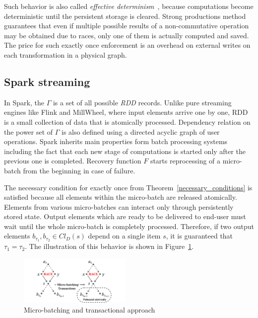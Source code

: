 Such behavior is also called {\em effective determinism}~\cite{akidau2018streaming}, because computations become deterministic until the persistent storage is cleared. Strong productions method guarantees that even if multiple possible results of a non-commutative operation may be obtained due to races, only one of them is actually computed and saved. The price for such exactly once enforcement is an overhead on external writes on each transformation in a physical graph.


\subsection{Spark streaming}

In Spark, the  $\Gamma$ is a set of all possible {\em RDD} records. Unlike pure streaming engines like Flink and MillWheel, where input elements arrive one by one, RDD is a small collection of data that is atomically processed. Dependency relation on the power set of $\Gamma$ is also defined using a directed acyclic graph of user operations. Spark inherits main properties form batch processing systems including the fact that each new stage of computations is started only after the previous one is completed. Recovery function $F$ starts reprocessing of a micro-batch from the beginning in case of failure.

The necessary condition for exactly once from Theorem~\ref{necessary_conditions} is satisfied because all elements within the micro-batch are released atomically. Elements from various micro-batches can interact only through persistently stored state. Output elements which are ready to be delivered to end-user must wait until the whole micro-batch is completely processed. Therefore, if two output elements $b_{\tau_1},b_{\tau_2} \in Cl_D(s)$ depend on a single item $s$, it is guaranteed that $\tau_1=\tau_2$. The illustration of this behavior is shown in Figure~\ref{spark_flink}. 

 
\begin{figure}[htbp]
  \centering
  \includegraphics[width=0.48\textwidth]{pics/spark-flink}
  \caption{Micro-batching and transactional approach}
  \label{spark_flink}
\end{figure}
 
